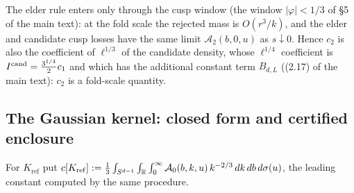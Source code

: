 \begin{remark}
The elder rule enters only through the cusp window (the window $|\varphi|<1/3$ of \S5 of the main text): at the fold scale the rejected mass is $O(r^3/k)$, and the elder and candidate cusp losses have the same limit $\mathcal A_2(b,0,u)$ as $s\downarrow0$. Hence $c_2$ is also the coefficient of $\ell^{1/3}$ of the candidate density, whose $\ell^{1/4}$ coefficient is $I^{\mathrm{cand}}=\frac{3^{1/4}}2c_1$ and which has the additional constant term $B_{d,L}$ ((2.17) of the main text): $c_2$ is a fold-scale quantity.
\end{remark}

\subsection{The Gaussian kernel: closed form and certified enclosure}\label{ssec:ctwo-closed}

For $K_{\mathrm{ref}}$ put $c[K_{\mathrm{ref}}]:=\frac13\int_{S^{d-1}}\int_\mathbb R\int_0^\infty\mathcal A_0(b,k,u)\,k^{-2/3}\,dk\,db\,d\sigma(u)$, the leading constant computed by the same procedure.


